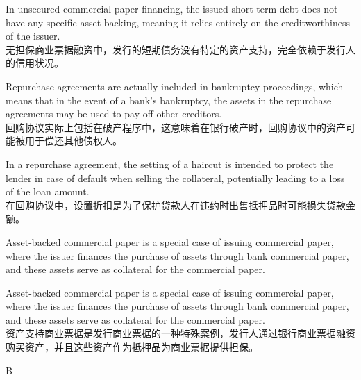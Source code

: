 \documentclass{article}
\begin{document}
                        \begin{choices}
                            \item In unsecured commercial paper financing, the issued short-term debt does not have any specific asset backing, meaning it relies entirely on the creditworthiness of the issuer.  \\
                            无担保商业票据融资中，发行的短期债务没有特定的资产支持，完全依赖于发行人的信用状况。
                            \item Repurchase agreements are actually included in bankruptcy proceedings, which means that in the event of a bank's bankruptcy, the assets in the repurchase agreements may be used to pay off other creditors.  \\
                            回购协议实际上包括在破产程序中，这意味着在银行破产时，回购协议中的资产可能被用于偿还其他债权人。
                            \item In a repurchase agreement, the setting of a haircut is intended to protect the lender in case of default when selling the collateral, potentially leading to a loss of the loan amount.  \\
                            在回购协议中，设置折扣是为了保护贷款人在违约时出售抵押品时可能损失贷款金额。
                            \item Asset-backed commercial paper is a special case of issuing commercial paper, where the issuer finances the purchase of assets through bank commercial paper, and these assets serve as collateral for the commercial paper.  
                            \item Asset-backed commercial paper is a special case of issuing commercial paper, where the issuer finances the purchase of assets through bank commercial paper, and these assets serve as collateral for the commercial paper.  \\
                            资产支持商业票据是发行商业票据的一种特殊案例，发行人通过银行商业票据融资购买资产，并且这些资产作为抵押品为商业票据提供担保。
                        \end{choices}
                        
                        \begin{correctanswer}
                        B
                        \end{correctanswer}
                        
\end{document}
